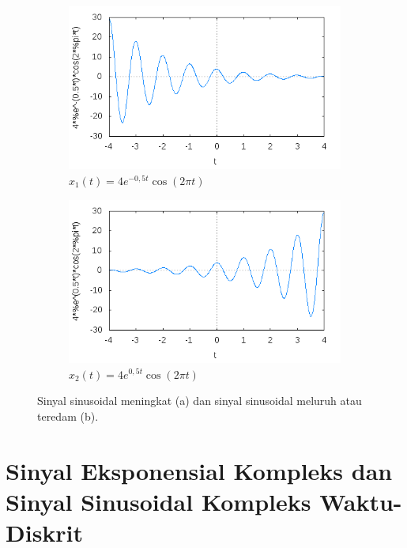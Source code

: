 \begin{figure}[!h]
\centering
\begin{subfigure}[b]{0.5\textwidth}
\includegraphics[width=\textwidth]{pict/sinusturun}
\caption{$x_1(t)=4e^{-0,5t}\cos(2\pi t)$}
\end{subfigure}%
\begin{subfigure}[b]{0.5\textwidth}
\includegraphics[width=\textwidth]{pict/sinusnaik}
\caption{$x_2(t)=4e^{0,5t}\cos(2\pi t)$}
\end{subfigure}
\caption{Sinyal sinusoidal meningkat (a) dan sinyal sinusoidal meluruh atau teredam (b).}
\end{figure}

\section{Sinyal Eksponensial Kompleks dan Sinyal Sinusoidal Kompleks Waktu-Diskrit}
